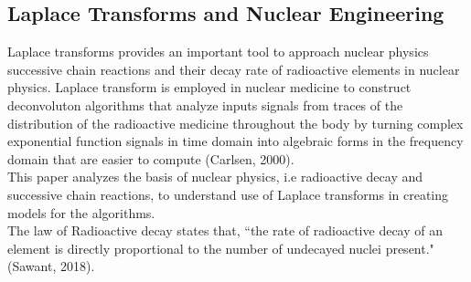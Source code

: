 \documentclass[12pt]{article}
\theoremstyle{plain}
\theoremstyle{definition}
\begin{document}
\subsection{Laplace Transforms and Nuclear Engineering }
Laplace transforms provides an important tool to approach nuclear physics successive chain reactions and their decay rate of radioactive elements in nuclear physics. Laplace transform is employed in nuclear medicine to construct deconvoluton algorithms that analyze inputs signals from traces of the distribution of the radioactive medicine throughout the body by turning complex exponential function signals in time domain into algebraic forms in the frequency domain that are easier to compute (Carlsen, 2000).
\\
This paper analyzes the basis of nuclear physics, i.e radioactive decay and successive chain reactions, to understand use of Laplace transforms in creating models for the algorithms.
\\
The law of Radioactive decay states that, ``the rate of radioactive decay of an element is directly proportional to the number of undecayed nuclei present." (Sawant, 2018).\\
\end{document}
